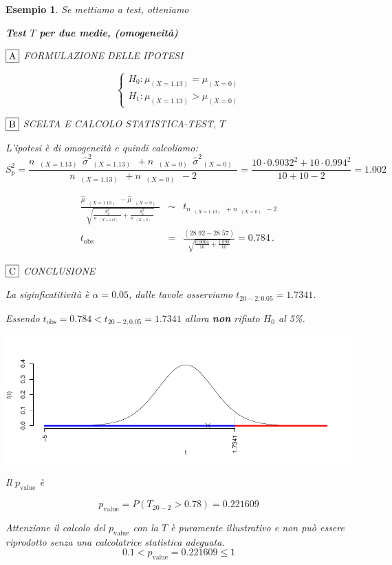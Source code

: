 \documentclass[
  11pt,
]{book}
\theoremstyle{mytheoremstyle}
\theoremstyle{mydefstyle}
\newtheorem{example}{{Esempio}}[section]
\begin{document}
\begin{example}
Se mettiamo a test, otteniamo

\textbf{Test \(T\) per due medie, (omogeneità)}

\(\fbox{A}\) FORMULAZIONE DELLE IPOTESI

\[\begin{cases}
   H_0: \mu_\text{$(X=1.13)$} = \mu_\text{$(X=0)$} \\
   H_1: \mu_\text{$(X=1.13)$} > \mu_\text{$(X=0)$} 
   \end{cases}\]

\(\fbox{B}\) SCELTA E CALCOLO STATISTICA-TEST, \(T\)

L'ipotesi è di omogeneità e quindi calcoliamo:\[
   S_p^2=\frac{n_\text{ $(X=1.13)$ }\hat\sigma^2_\text{ $(X=1.13)$ }+n_\text{ $(X=0)$ }\hat\sigma^2_\text{ $(X=0)$ }}{n_\text{ $(X=1.13)$ }+n_\text{ $(X=0)$ }-2} =
   \frac{ 10 \cdot 0.9032 ^2+ 10 \cdot 0.994 ^2}{ 10 + 10 -2}= 1.002 
  \]

\begin{eqnarray*}
  \frac{\hat\mu_\text{ $(X=1.13)$ } - \hat\mu_\text{ $(X=0)$ }}
  {\sqrt{\frac {S^2_p}{n_\text{ $(X=1.13)$ }}+\frac {S^2_p}{n_\text{ $(X=0)$ }}}}&\sim&t_{n_\text{ $(X=1.13)$ }+n_\text{ $(X=0)$ }-2}\\
  t_{\text{obs}}
  &=& \frac{ ( 28.92 -  28.57 )} {\sqrt{\frac{ 0.9064 }{ 10 }+\frac{ 1.098 }{ 10 }}}
  =   0.784 \, .
  \end{eqnarray*}

\(\fbox{C}\) CONCLUSIONE

La siginficatitività è \(\alpha=0.05\), dalle tavole osserviamo \(t_{20-2;0.05}=1.7341\).

Essendo \(t_\text{obs}=0.784<t_{20-2;0.05}=1.7341\) allora \textbf{non} rifiuto \(H_0\) al 5\%.

\begin{center}\includegraphics{Appunti_di_Statistica_2025_files/figure-latex/17-regressione-I-1,-1} \end{center}

Il \(p_{\text{value}}\) è

\[ p_{\text{value}} = P(T_{20-2}>0.78)=0.221609 \]

Attenzione il calcolo del \(p_\text{value}\) con la \(T\) è puramente illustrativo e non può essere riprodotto senza una calcolatrice statistica adeguata.\[
 0.1 < p_\text{value}= 0.221609 \leq 1 
\]
\end{example}
\end{document}
